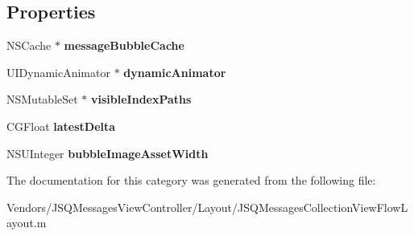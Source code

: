 \subsection*{Properties}
\begin{DoxyCompactItemize}
\item 
\hypertarget{category_j_s_q_messages_collection_view_flow_layout_07_08_a988ddd1199649364c54e4b63edade176}{}N\+S\+Cache $\ast$ {\bfseries message\+Bubble\+Cache}\label{category_j_s_q_messages_collection_view_flow_layout_07_08_a988ddd1199649364c54e4b63edade176}

\item 
\hypertarget{category_j_s_q_messages_collection_view_flow_layout_07_08_a25448211f82743cc765268148bebd080}{}U\+I\+Dynamic\+Animator $\ast$ {\bfseries dynamic\+Animator}\label{category_j_s_q_messages_collection_view_flow_layout_07_08_a25448211f82743cc765268148bebd080}

\item 
\hypertarget{category_j_s_q_messages_collection_view_flow_layout_07_08_a26e42559a29d5862e41124bd224601ce}{}N\+S\+Mutable\+Set $\ast$ {\bfseries visible\+Index\+Paths}\label{category_j_s_q_messages_collection_view_flow_layout_07_08_a26e42559a29d5862e41124bd224601ce}

\item 
\hypertarget{category_j_s_q_messages_collection_view_flow_layout_07_08_a689730100411160c49bb9fe36ac3adea}{}C\+G\+Float {\bfseries latest\+Delta}\label{category_j_s_q_messages_collection_view_flow_layout_07_08_a689730100411160c49bb9fe36ac3adea}

\item 
\hypertarget{category_j_s_q_messages_collection_view_flow_layout_07_08_aaa8b6735d0e66f7badc0468621a84f22}{}N\+S\+U\+Integer {\bfseries bubble\+Image\+Asset\+Width}\label{category_j_s_q_messages_collection_view_flow_layout_07_08_aaa8b6735d0e66f7badc0468621a84f22}

\end{DoxyCompactItemize}


The documentation for this category was generated from the following file\+:\begin{DoxyCompactItemize}
\item 
Vendors/\+J\+S\+Q\+Messages\+View\+Controller/\+Layout/J\+S\+Q\+Messages\+Collection\+View\+Flow\+Layout.\+m\end{DoxyCompactItemize}

